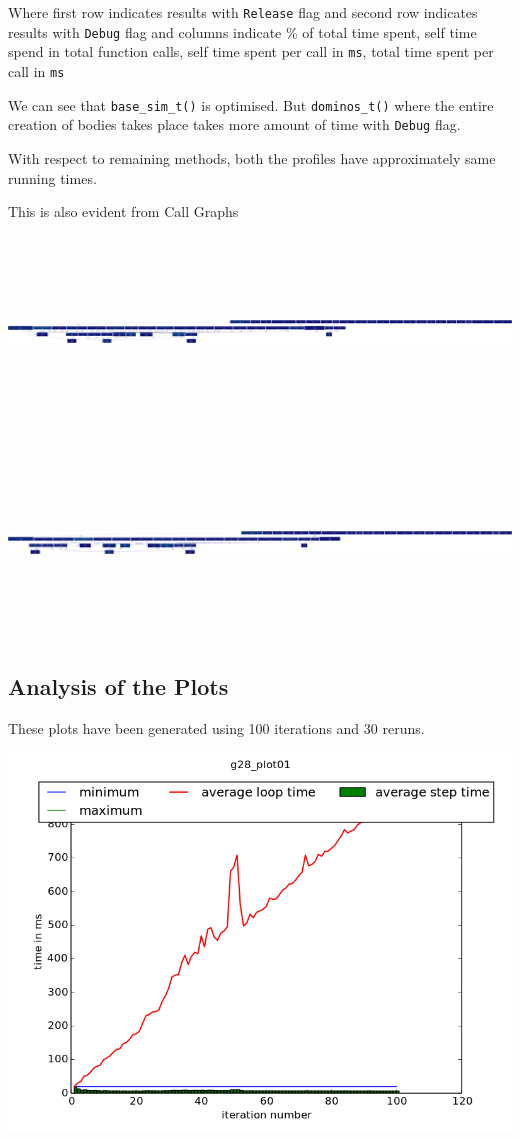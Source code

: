\documentclass[11pt]{article}
\begin{document}
Where first row indicates results with {\tt Release} flag and second row indicates results with {\tt Debug} flag and columns indicate \% of total time spent, self time spend in total function calls, self time spent per call in {\tt ms}, total time spent per call in {\tt ms}

We can see that {\tt base\_sim\_t()} is optimised. But {\tt dominos\_t()} where the entire creation of bodies takes place takes more amount of time with {\tt Debug} flag.

With respect to remaining methods, both the profiles have approximately same running times.

This is also evident from Call Graphs

\includegraphics[width=7.7in, height=2in]{debug.png}

\includegraphics[width=7.7in, height=2in]{release.png}

\subsection*{Analysis of the Plots}
These plots have been generated using 100 iterations and 30 reruns.

\centerline{
\includegraphics[scale = 0.5]{g28_plot01.png}
}
\end{document}
